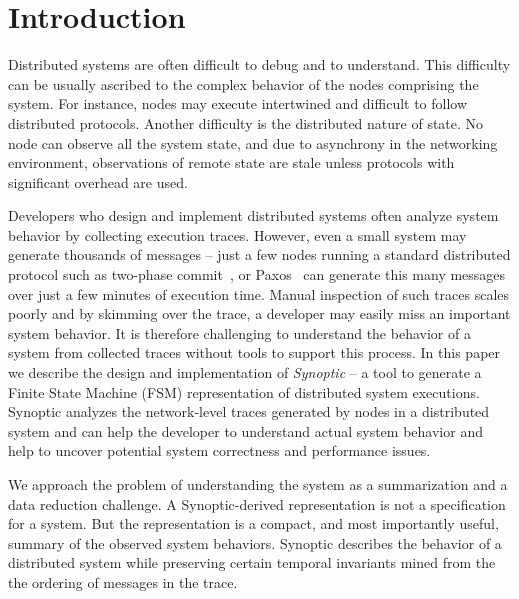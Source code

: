 \section{Introduction}

Distributed systems are often difficult to debug and to
understand. This difficulty can be usually ascribed to the complex
behavior of the nodes comprising the system. For instance, nodes may
execute intertwined and difficult to follow distributed protocols.
Another difficulty is the distributed nature of state. No node can
observe all the system state, and due to asynchrony in the networking
environment, observations of remote state are stale unless protocols
with significant overhead are used.


Developers who design and implement distributed systems often analyze
system behavior by collecting execution traces. However, even a small
system may generate thousands of messages -- just a few nodes running
a standard distributed protocol such as two-phase
commit~\cite{TwoPhaseCommit}, or Paxos~\cite{Paxos} can generate this
many messages over just a few minutes of execution time. Manual
inspection of such traces scales poorly and by skimming over the
trace, a developer may easily miss an important system behavior. It is
therefore challenging to understand the behavior of a system from
collected traces without tools to support this process. In this paper
we describe the design and implementation of \emph{Synoptic} -- a tool
to generate a Finite State Machine (FSM) representation of distributed
system executions. Synoptic analyzes the network-level traces
generated by nodes in a distributed system and can help the developer
to understand actual system behavior and help to uncover potential
system correctness and performance issues.

We approach the problem of understanding the system as a summarization
and a data reduction challenge. A Synoptic-derived representation is
not a specification for a system. But the representation is a compact,
and most importantly useful, summary of the observed system behaviors.
Synoptic describes the behavior of a distributed system while
preserving certain temporal invariants mined from the the ordering of
messages in the trace.

